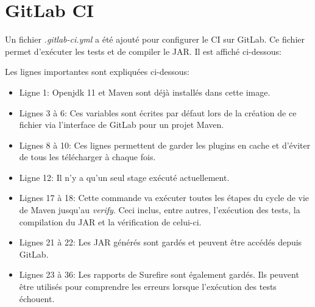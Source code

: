\chapter{GitLab CI}

Un fichier \textit{.gitlab-ci.yml} a été ajouté pour configurer le CI sur GitLab. Ce fichier permet d'exécuter les tests et de compiler le \gls{JAR}. Il est affiché ci-dessous:



Les lignes importantes sont expliquées ci-dessous:

\begin{itemize}
    \item Ligne 1: Openjdk 11 et \gls{Maven} sont déjà installés dans cette image.
    \item Lignes 3 à 6: Ces variables sont écrites par défaut lors de la création de ce fichier via l'interface de GitLab pour un projet \gls{Maven}.
    \item Lignes 8 à 10: Ces lignes permettent de garder les plugins en cache et d'éviter de tous les télécharger à chaque fois.
    \item Ligne 12: Il n'y a qu'un seul stage exécuté actuellement.
    \item Lignes 17 à 18: Cette commande va exécuter toutes les étapes du cycle de vie de \gls{Maven} jusqu'au \textit{verify}. Ceci inclus, entre autres, l'exécution des tests, la compilation du \gls{JAR} et la vérification de celui-ci.
    \item Lignes 21 à 22: Les \gls{JAR} générés sont gardés et peuvent être accédés depuis GitLab.
    \item Lignes 23 à 36: Les rapports de Surefire sont également gardés. Ils peuvent être utilisés pour comprendre les erreurs lorsque l'exécution des tests échouent.
\end{itemize}